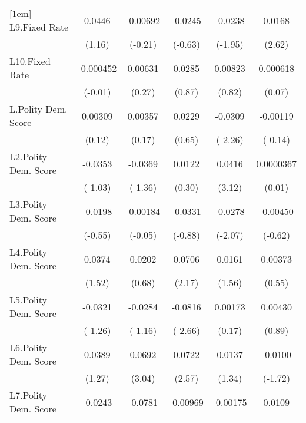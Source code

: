 {\begin{longtable}{l*{5}{c}}
[1em]
L9.Fixed Rate   &   0.0446         & -0.00692         &  -0.0245         &  -0.0238         &   0.0168\sym{**} \\
                &   (1.16)         &  (-0.21)         &  (-0.63)         &  (-1.95)         &   (2.62)         \\
[1em]
L10.Fixed Rate  &-0.000452         &  0.00631         &   0.0285         &  0.00823         & 0.000618         \\
                &  (-0.01)         &   (0.27)         &   (0.87)         &   (0.82)         &   (0.07)         \\
[1em]
L.Polity Dem. Score&  0.00309         &  0.00357         &   0.0229         &  -0.0309\sym{*}  & -0.00119         \\
                &   (0.12)         &   (0.17)         &   (0.65)         &  (-2.26)         &  (-0.14)         \\
[1em]
L2.Polity Dem. Score&  -0.0353         &  -0.0369         &   0.0122         &   0.0416\sym{**} &0.0000367         \\
                &  (-1.03)         &  (-1.36)         &   (0.30)         &   (3.12)         &   (0.01)         \\
[1em]
L3.Polity Dem. Score&  -0.0198         & -0.00184         &  -0.0331         &  -0.0278\sym{*}  & -0.00450         \\
                &  (-0.55)         &  (-0.05)         &  (-0.88)         &  (-2.07)         &  (-0.62)         \\
[1em]
L4.Polity Dem. Score&   0.0374         &   0.0202         &   0.0706\sym{*}  &   0.0161         &  0.00373         \\
                &   (1.52)         &   (0.68)         &   (2.17)         &   (1.56)         &   (0.55)         \\
[1em]
L5.Polity Dem. Score&  -0.0321         &  -0.0284         &  -0.0816\sym{**} &  0.00173         &  0.00430         \\
                &  (-1.26)         &  (-1.16)         &  (-2.66)         &   (0.17)         &   (0.89)         \\
[1em]
L6.Polity Dem. Score&   0.0389         &   0.0692\sym{**} &   0.0722\sym{*}  &   0.0137         &  -0.0100         \\
                &   (1.27)         &   (3.04)         &   (2.57)         &   (1.34)         &  (-1.72)         \\
[1em]
L7.Polity Dem. Score&  -0.0243         &  -0.0781\sym{***}& -0.00969         & -0.00175         &   0.0109         \\

\end{longtable}}
